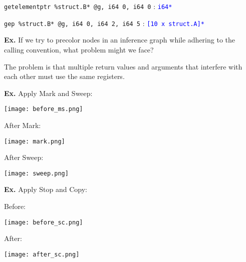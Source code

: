\texttt{getelementptr \%struct.B* @g, i64 0, i64 0} : \textcolor{blue}{\texttt{i64*}}

\texttt{gep \%struct.B* @g, i64 0, i64 2, i64 5} : \textcolor{blue}{\texttt{[10 x struct.A]*}}

\hrulefill

\textbf{Ex.} If we try to precolor nodes in an inference graph while adhering to the calling convention, what problem might we face?\medskip

The problem is that multiple return values and arguments that interfere with each other must use the same registers.

\hrulefill

\textbf{Ex.} Apply Mark and Sweep:

\vspace{-11pt}
\begin{center}
	\texttt{[image: before\_ms.png]}
\end{center}

\begin{multicols*}{2}
After Mark:

\texttt{[image: mark.png]}

After Sweep:

\texttt{[image: sweep.png]}
\end{multicols*}

\hrulefill

\textbf{Ex.} Apply Stop and Copy:
\begin{multicols*}{2}
Before:

\texttt{[image: before\_sc.png]}
\columnbreak

After:
\vspace{-11pt}

\texttt{[image: after\_sc.png]}
\end{multicols*}